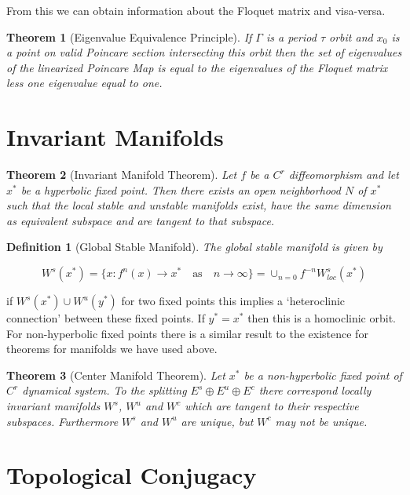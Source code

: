 \documentclass{article}
\newtheorem{theorem}{Theorem}
\newtheorem{definition}{Definition}
\begin{document}
From this we can obtain information about the Floquet matrix and visa-versa.

\begin{theorem}[Eigenvalue Equivalence Principle]
    If $\Gamma$ is a period $\tau$ orbit and $x_0$ is a point on valid Poincare section intersecting 
    this orbit then the set of eigenvalues of the linearized Poincare Map is equal to the eigenvalues of 
    the Floquet matrix less one eigenvalue equal to one.
\end{theorem}

\section*{Invariant Manifolds}

\begin{theorem}[Invariant Manifold Theorem]
Let $f$ be a $C^r$ diffeomorphism and let $x^*$ be a hyperbolic fixed point. Then there exists 
an open neighborhood $N$ of $x^*$ such that the local stable and unstable manifolds exist, have 
the same dimension as equivalent subspace and are tangent to that subspace.
\end{theorem}

\begin{definition}[Global Stable Manifold]
    The global stable manifold is given by 

    \begin{equation*}
        W^s(x^*) = \{x:f^n(x) \rightarrow x^* \quad \text{as} \quad n \rightarrow \infty\} = \cup_{n=0}f^{-n}W^s_{loc}(x^*)
    \end{equation*}
\end{definition}

if $W^s(x^*) \cup W^u(y^*)$ for two fixed points this implies a `heteroclinic connection' between 
these fixed points. If $y^* = x^*$ then this is a homoclinic orbit. For non-hyperbolic fixed 
points there is a similar result to the existence for theorems for manifolds we have used 
above.

\begin{theorem}[Center Manifold Theorem]
    Let $x^*$ be a non-hyperbolic fixed point of $C^r$ dynamical system. To the splitting $E^s \oplus E^u \oplus E^c$ 
    there correspond locally invariant manifolds $W^s$, $W^u$ and $W^c$ which are tangent to 
    their respective subspaces. Furthermore $W^s$ and $W^u$ are unique, but $W^c$ may not be unique.
\end{theorem}

\section*{Topological Conjugacy}
\end{document}
